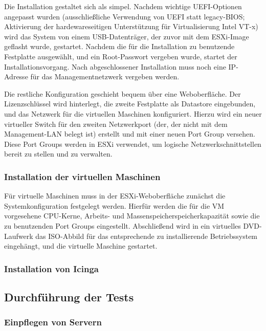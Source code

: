 Die Installation gestaltet sich als simpel. Nachdem wichtige UEFI-Optionen angepasst wurden (ausschließliche Verwendung von UEFI statt legacy-BIOS; Aktivierung der hardewareseitigen Unterstützung für Virtualisierung \glqq{}Intel VT-x\grqq{}) wird das System von einem USB-Datenträger, der zuvor mit dem ESXi-Image geflasht wurde, gestartet. Nachdem die für die Installation zu benutzende Festplatte ausgewählt, und ein Root-Passwort vergeben wurde, startet der Installationsvorgang. Nach abgeschlossener Installation muss noch eine IP-Adresse für das Managementnetzwerk vergeben werden.

Die restliche Konfiguration geschieht bequem über eine Weboberfläche. Der Lizenzschlüssel wird hinterlegt, die zweite Festplatte als Datastore eingebunden, und das Netzwerk für die virtuellen Maschinen konfiguriert. Hierzu wird ein neuer virtueller Switch für den zweiten Netzwerkport (der, der nicht mit dem Management-LAN belegt ist) erstellt und mit einer neuen Port Group versehen. Diese Port Groups werden in ESXi verwendet, um logische Netzwerkschnittstellen bereit zu stellen und zu verwalten. 

\subsubsection{Installation der virtuellen Maschinen}
\label{sec:InstallationVMs}
Für virtuelle Maschinen muss in der ESXi-Weboberfläche zunächst die Systemkonfiguration festgelegt werden. Hierfür werden die für die VM vorgesehene CPU-Kerne, Arbeits- und Massenspeicherspeicherkapazität sowie die zu benutzenden Port Groups eingestellt. Abschließend wird in ein virtuelles DVD-Laufwerk das ISO-Abbild für das entsprechende zu installierende Betriebssystem eingehängt, und die virtuelle Maschine gestartet.


\subsubsection{Installation von \glqq{}Icinga\grqq{}}
\label{sec:InstallationIcinga}

\subsection{Durchführung der Tests}
\label{sec:DurchführungTests}

\subsubsection{Einpflegen von Servern}
\label{sec:EinpflegenServer}

